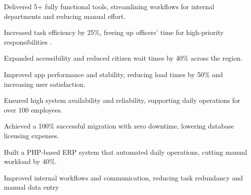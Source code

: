 \begin{zitemize}
\item Delivered 5+ fully functional tools, streamlining workflows for internal departments and reducing manual effort.
\item Increased task efficiency by 25\%, freeing up officers’ time for high-priority responsibilities .
\item Expanded accessibility and reduced citizen wait times by 40\% across the region.
\item Improved app performance and stability, reducing load times by 50\% and increasing user satisfaction.
\end{zitemize}

\begin{zitemize}
\item Ensured high system availability and reliability, supporting daily operations for over 100 employees.
\item Achieved a 100\% successful migration with zero downtime, lowering database licensing expenses.
\item Built a PHP-based ERP system that automated daily operations, cutting manual workload by 40\%.
\item Improved internal workflows and communication, reducing task redundancy and manual data entry
\end{zitemize}